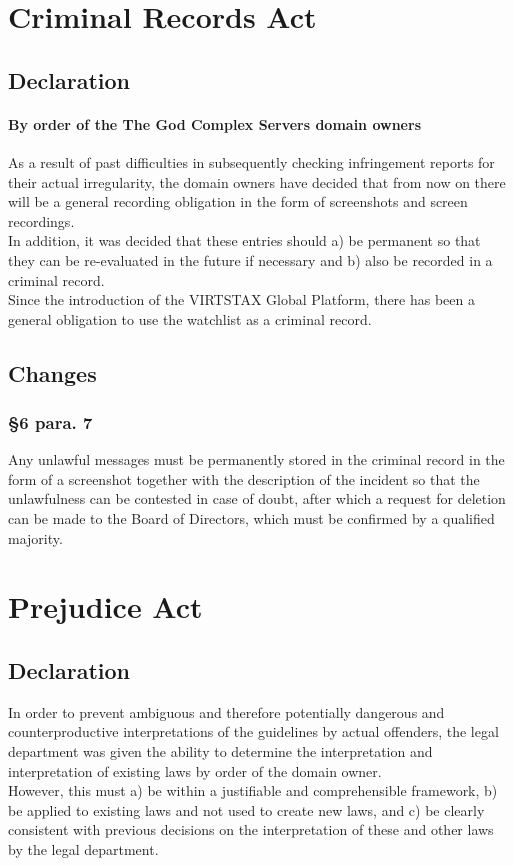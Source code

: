 \documentclass{cjs9}
\begin{document}
\section{Criminal Records Act}
\subsection{Declaration}
\paragraph{By order of the The God Complex Servers domain owners\\}
As a result of past difficulties in subsequently checking infringement reports for their actual irregularity, the domain owners have decided that from now on there will be a general recording obligation in the form of screenshots and screen recordings. 
\\In addition, it was decided that these entries should a) be permanent so that they can be re-evaluated in the future if necessary and b) also be recorded in a criminal record.
\\Since the introduction of the VIRTSTAX Global Platform, there has been a general obligation to use the watchlist as a criminal record.
\subsection{Changes}
\subsubsection*{§6 para. 7}
Any unlawful messages must be permanently stored in the criminal record in the form of a screenshot together with the description of the incident so that the unlawfulness can be contested in case of doubt, after which a request for deletion can be made to the Board of Directors, which must be confirmed by a qualified majority.
\newpage
\section{Prejudice Act}
\subsection{Declaration}
In order to prevent ambiguous and therefore potentially dangerous and counterproductive interpretations of the guidelines by actual offenders, the legal department was given the ability to determine the interpretation and interpretation of existing laws by order of the domain owner.
\\However, this must a) be within a justifiable and comprehensible framework, b) be applied to existing laws and not used to create new laws, and c) be clearly consistent with previous decisions on the interpretation of these and other laws by the legal department.
\end{document}
